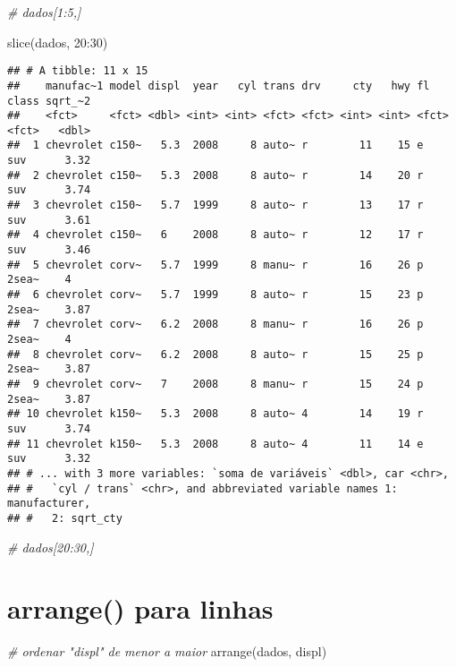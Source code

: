 \documentclass[
]{book}
\newenvironment{Shaded}{\begin{snugshade}}{\end{snugshade}}
\newcommand{\CommentTok}[1]{\textcolor[rgb]{0.56,0.35,0.01}{\textit{#1}}}
\newcommand{\DecValTok}[1]{\textcolor[rgb]{0.00,0.00,0.81}{#1}}
\newcommand{\FunctionTok}[1]{\textcolor[rgb]{0.00,0.00,0.00}{#1}}
\newcommand{\NormalTok}[1]{#1}
\newcommand{\SpecialCharTok}[1]{\textcolor[rgb]{0.00,0.00,0.00}{#1}}
\begin{document}
\begin{Shaded}
\begin{Highlighting}[]
\CommentTok{\# dados[1:5,]}

\FunctionTok{slice}\NormalTok{(dados, }\DecValTok{20}\SpecialCharTok{:}\DecValTok{30}\NormalTok{)}
\end{Highlighting}
\end{Shaded}

\begin{verbatim}
## # A tibble: 11 x 15
##    manufac~1 model displ  year   cyl trans drv     cty   hwy fl    class sqrt_~2
##    <fct>     <fct> <dbl> <int> <int> <fct> <fct> <int> <int> <fct> <fct>   <dbl>
##  1 chevrolet c150~   5.3  2008     8 auto~ r        11    15 e     suv      3.32
##  2 chevrolet c150~   5.3  2008     8 auto~ r        14    20 r     suv      3.74
##  3 chevrolet c150~   5.7  1999     8 auto~ r        13    17 r     suv      3.61
##  4 chevrolet c150~   6    2008     8 auto~ r        12    17 r     suv      3.46
##  5 chevrolet corv~   5.7  1999     8 manu~ r        16    26 p     2sea~    4   
##  6 chevrolet corv~   5.7  1999     8 auto~ r        15    23 p     2sea~    3.87
##  7 chevrolet corv~   6.2  2008     8 manu~ r        16    26 p     2sea~    4   
##  8 chevrolet corv~   6.2  2008     8 auto~ r        15    25 p     2sea~    3.87
##  9 chevrolet corv~   7    2008     8 manu~ r        15    24 p     2sea~    3.87
## 10 chevrolet k150~   5.3  2008     8 auto~ 4        14    19 r     suv      3.74
## 11 chevrolet k150~   5.3  2008     8 auto~ 4        11    14 e     suv      3.32
## # ... with 3 more variables: `soma de variáveis` <dbl>, car <chr>,
## #   `cyl / trans` <chr>, and abbreviated variable names 1: manufacturer,
## #   2: sqrt_cty
\end{verbatim}

\begin{Shaded}
\begin{Highlighting}[]
\CommentTok{\# dados[20:30,]}
\end{Highlighting}
\end{Shaded}

\hypertarget{arrange-para-linhas}{%
\section{arrange() para linhas}\label{arrange-para-linhas}}

\begin{Shaded}
\begin{Highlighting}[]
\CommentTok{\# ordenar "displ" de menor a maior}
\FunctionTok{arrange}\NormalTok{(dados, displ)}
\end{Highlighting}
\end{Shaded}
\end{document}
